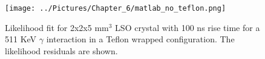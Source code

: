 \begin{figure}[htbp]
\begin{center}
\texttt{[image: ../Pictures/Chapter\_6/matlab\_no\_teflon.png]}
\end{center}
\caption[Likelihood fit for LSO Teflon wrapped]{Likelihood fit for 2x2x5 mm$^{3}$ LSO crystal with 100 ns rise time for a 511 KeV $\gamma$ interaction in a Teflon wrapped configuration. The likelihood residuals are shown.}
\label{fig:matlab_no_teflon}
\end{figure}